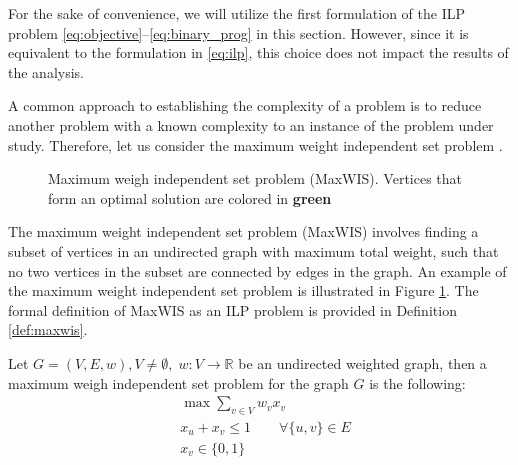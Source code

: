 For the sake of convenience, we will utilize the first formulation of the ILP
problem \eqref{eq:objective}--\eqref{eq:binary_prog} in this section. However,
since it is equivalent to the formulation in \eqref{eq:ilp}, this choice does not
impact the results of the analysis.

A common approach to establishing the complexity of a problem is to reduce another
problem with a known complexity to an instance of the problem under study.
Therefore, let us consider the maximum weight independent set problem
\cite{pemmaraju2003computational}.

\begin{figure}[ht]
  \centering
  \caption{Maximum weigh independent set problem (MaxWIS). Vertices that form an optimal solution are colored in \textbf{\textcolor{green!50}{green}}}
  \label{fig:maxwis}
\end{figure}

The maximum weight independent set problem (MaxWIS) involves finding a subset of
vertices in an undirected graph with maximum total weight, such that no two vertices in
the subset are connected by edges in the graph. An example of the maximum weight
independent set problem is illustrated in Figure \ref{fig:maxwis}.
The formal definition of MaxWIS as an ILP problem is provided in Definition \ref{def:maxwis}.
\begin{definition}[MaxWIS] \label{def:maxwis}
  Let \( G=(V, E, w), V \neq \emptyset, \; w: V \rightarrow \mathbb{R} \) be an undirected weighted graph, then a maximum weigh
  independent set problem for the graph \( G \) is the following:
  \begin{align*}
    & \max \sum\limits_{v \in V} w_v x_v                               \\
    & x_u + x_v \leq 1               \qquad \forall \{u, v\} \in E \\
    & x_v \in \{0, 1\}
  \end{align*}
\end{definition}

